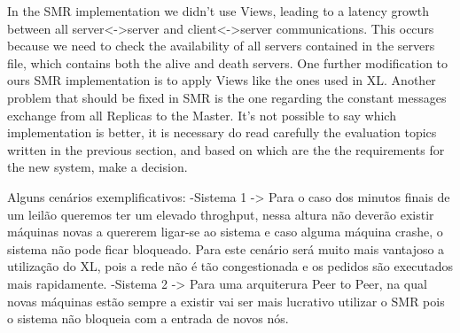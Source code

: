 \documentclass[times, 10pt,twocolumn]{article}
\begin{document}


In the SMR implementation we didn't use Views, leading to a latency growth between all server<->server and client<->server communications. 
This occurs because we need to check the availability of all servers contained in the servers file, which contains both the alive and death 
servers. One further modification to ours SMR implementation is to apply Views like the ones used in XL. 
Another problem that should be fixed in SMR is the one regarding the constant messages exchange from all Replicas to the Master.
It's not possible to say which implementation is better, it is necessary do read carefully the evaluation topics written in the previous section,
and based on which are the the requirements for the new system, make a decision.

Alguns cenários exemplificativos:
-Sistema 1 -> Para o caso dos minutos finais de um leilão queremos ter um elevado throghput, nessa altura não deverão existir máquinas novas a 
quererem ligar-se ao sistema e caso alguma máquina crashe, o sistema não pode ficar bloqueado. Para este cenário será muito mais vantajoso a 
utilização do XL, pois a rede não é tão congestionada e os pedidos são executados mais rapidamente. 
-Sistema 2 -> Para uma arquiterura Peer to Peer, na qual novas máquinas estão sempre a existir vai ser mais lucrativo utilizar o SMR pois o sistema
não bloqueia com a entrada de novos nós.

\nocite{ex1,ex2}


\end{document}

